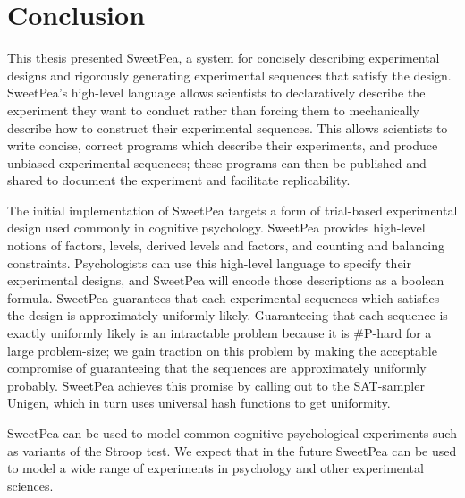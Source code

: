 \chapter{Conclusion}

This thesis presented SweetPea, a system for concisely describing experimental designs and rigorously generating experimental sequences that satisfy the design. SweetPea's high-level language allows scientists to declaratively describe the experiment they want to conduct rather than forcing them to mechanically describe how to construct their experimental sequences. This allows scientists to write concise, correct programs which describe their experiments, and produce unbiased experimental sequences; these programs can then be published and shared to document the experiment and facilitate replicability.

The initial implementation of SweetPea targets a form of trial-based experimental design used commonly in cognitive psychology. SweetPea provides high-level notions of factors, levels, derived levels and factors, and counting and balancing constraints. Psychologists can use this high-level language to specify their experimental designs, and SweetPea will encode those descriptions as a boolean formula. SweetPea guarantees that each experimental sequences which satisfies the design is approximately uniformly likely. Guaranteeing that each sequence is exactly uniformly likely is an intractable problem because it is \#P-hard for a large problem-size; we gain traction on this problem by making the acceptable compromise of guaranteeing that the sequences are approximately uniformly probably. SweetPea achieves this promise by calling out to the SAT-sampler Unigen, which in turn uses universal hash functions to get uniformity.

SweetPea can be used to model common cognitive psychological experiments such as variants of the Stroop test. We expect that in the future SweetPea can be used to model a wide range of experiments in psychology and other experimental sciences.
